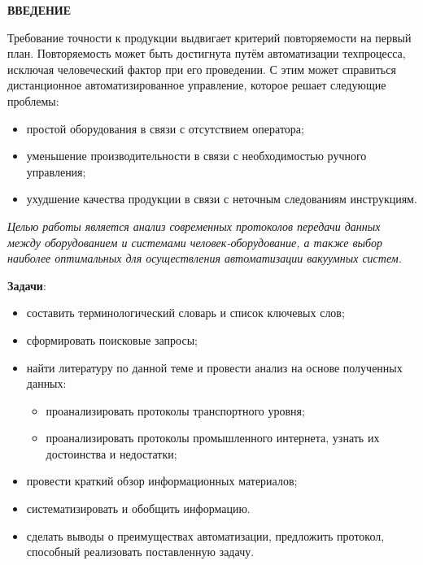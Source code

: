 \begin{center}
	\normalsize\bfseries\MakeUppercase{введение}
\end{center}

Требование точности к продукции выдвигает критерий повторяемости на первый план. Повторяемость может быть достигнута путём автоматизации техпроцесса, исключая человеческий фактор при его проведении. С этим может справиться дистанционное автоматизированное управление, которое решает следующие проблемы:

\begin{itemize}
	\item простой оборудования в связи с отсутствием оператора;
	\item уменьшение производительности в связи с необходимостью ручного управления;
	\item ухудшение качества продукции в связи с неточным следованиям инструкциям.
\end{itemize}


\textit{Целью работы является анализ современных протоколов передачи данных между оборудованием и системами человек-оборудование, а также выбор наиболее оптимальных для осуществления автоматизации вакуумных систем.}

\textbf{Задачи}:
\begin{itemize}
	\item  составить терминологический словарь и список ключевых слов; 
	\item  сформировать поисковые запросы; 
	\item  найти литературу по данной теме и провести анализ на основе полученных данных:
	\begin{itemize}
		\item проанализировать протоколы транспортного уровня;
		\item проанализировать протоколы промышленного интернета, узнать их достоинства и недостатки;
	\end{itemize}
	\item  провести краткий обзор информационных материалов;
	\item  систематизировать и обобщить информацию.
	\item сделать выводы о преимуществах автоматизации, предложить протокол, способный реализовать поставленную задачу.
\end{itemize}



